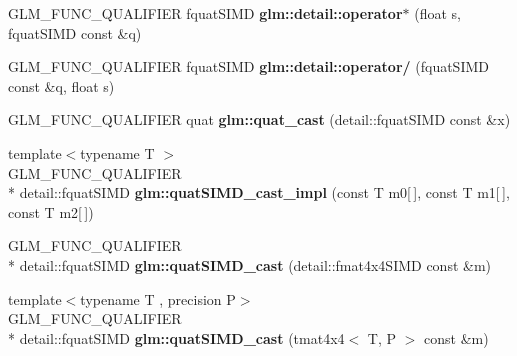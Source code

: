\begin{DoxyCompactItemize}
\item 
\hypertarget{namespaceglm_1_1detail_a586bbba0bf2940cecf9565510005679a}{G\-L\-M\-\_\-\-F\-U\-N\-C\-\_\-\-Q\-U\-A\-L\-I\-F\-I\-E\-R fquat\-S\-I\-M\-D {\bfseries glm\-::detail\-::operator$\ast$} (float s, fquat\-S\-I\-M\-D const \&q)}\label{namespaceglm_1_1detail_a586bbba0bf2940cecf9565510005679a}

\item 
\hypertarget{namespaceglm_1_1detail_a242a463e8c91e55fd54ad6a68016e839}{G\-L\-M\-\_\-\-F\-U\-N\-C\-\_\-\-Q\-U\-A\-L\-I\-F\-I\-E\-R fquat\-S\-I\-M\-D {\bfseries glm\-::detail\-::operator/} (fquat\-S\-I\-M\-D const \&q, float s)}\label{namespaceglm_1_1detail_a242a463e8c91e55fd54ad6a68016e839}

\item 
\hypertarget{namespaceglm_a68af15a87ea3aac558767c9bb2ed141d}{G\-L\-M\-\_\-\-F\-U\-N\-C\-\_\-\-Q\-U\-A\-L\-I\-F\-I\-E\-R quat {\bfseries glm\-::quat\-\_\-cast} (detail\-::fquat\-S\-I\-M\-D const \&x)}\label{namespaceglm_a68af15a87ea3aac558767c9bb2ed141d}

\item 
\hypertarget{namespaceglm_a2e2bb4244525831b56079cdacc87948d}{{\footnotesize template$<$typename T $>$ }\\G\-L\-M\-\_\-\-F\-U\-N\-C\-\_\-\-Q\-U\-A\-L\-I\-F\-I\-E\-R \\*
detail\-::fquat\-S\-I\-M\-D {\bfseries glm\-::quat\-S\-I\-M\-D\-\_\-cast\-\_\-impl} (const T m0\mbox{[}$\,$\mbox{]}, const T m1\mbox{[}$\,$\mbox{]}, const T m2\mbox{[}$\,$\mbox{]})}\label{namespaceglm_a2e2bb4244525831b56079cdacc87948d}

\item 
\hypertarget{namespaceglm_a0c09f4c773ffd14c3d9246a50011cf0c}{G\-L\-M\-\_\-\-F\-U\-N\-C\-\_\-\-Q\-U\-A\-L\-I\-F\-I\-E\-R \\*
detail\-::fquat\-S\-I\-M\-D {\bfseries glm\-::quat\-S\-I\-M\-D\-\_\-cast} (detail\-::fmat4x4\-S\-I\-M\-D const \&m)}\label{namespaceglm_a0c09f4c773ffd14c3d9246a50011cf0c}

\item 
\hypertarget{namespaceglm_a69b23f5cf01145b981cfb276c15813bb}{{\footnotesize template$<$typename T , precision P$>$ }\\G\-L\-M\-\_\-\-F\-U\-N\-C\-\_\-\-Q\-U\-A\-L\-I\-F\-I\-E\-R \\*
detail\-::fquat\-S\-I\-M\-D {\bfseries glm\-::quat\-S\-I\-M\-D\-\_\-cast} (tmat4x4$<$ T, P $>$ const \&m)}\label{namespaceglm_a69b23f5cf01145b981cfb276c15813bb}


\end{DoxyCompactItemize}
